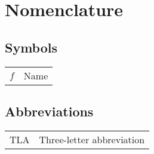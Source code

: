 \documentclass[../main.tex]{subfiles}
\begin{document}
\chapter*{Nomenclature}

\section*{Symbols}

\begin{longtable}[l]{ l l }
    $f$ & Name \\
\end{longtable}

\pagebreak

\section*{Abbreviations}

\begin{longtable}[l]{ l l }
    TLA & Three-letter abbreviation \\
\end{longtable}
\end{document}
